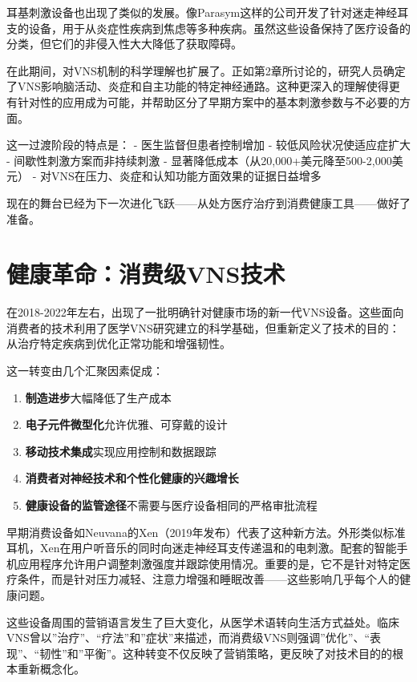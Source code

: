 \documentclass[
  Letterpaper,
]{scrbook}
\providecommand{\tightlist}{%
  \setlength{\itemsep}{0pt}\setlength{\parskip}{0pt}}\usepackage{longtable,booktabs,array}
\begin{document}
耳基刺激设备也出现了类似的发展。像Parasym这样的公司开发了针对迷走神经耳支的设备，用于从炎症性疾病到焦虑等多种疾病。虽然这些设备保持了医疗设备的分类，但它们的非侵入性大大降低了获取障碍。

在此期间，对VNS机制的科学理解也扩展了。正如第2章所讨论的，研究人员确定了VNS影响脑活动、炎症和自主功能的特定神经通路。这种更深入的理解使得更有针对性的应用成为可能，并帮助区分了早期方案中的基本刺激参数与不必要的方面。

这一过渡阶段的特点是： - 医生监督但患者控制增加 -
较低风险状况使适应症扩大 - 间歇性刺激方案而非持续刺激 -
显著降低成本（从20,000+美元降至500-2,000美元） -
对VNS在压力、炎症和认知功能方面效果的证据日益增多

现在的舞台已经为下一次进化飞跃------从处方医疗治疗到消费健康工具------做好了准备。

\section{健康革命：消费级VNS技术}\label{ux5065ux5eb7ux9769ux547dux6d88ux8d39ux7ea7vnsux6280ux672f}

在2018-2022年左右，出现了一批明确针对健康市场的新一代VNS设备。这些面向消费者的技术利用了医学VNS研究建立的科学基础，但重新定义了技术的目的：从治疗特定疾病到优化正常功能和增强韧性。

这一转变由几个汇聚因素促成：

\begin{enumerate}
\def\labelenumi{\arabic{enumi}.}
\tightlist
\item
  \textbf{制造进步}大幅降低了生产成本
\item
  \textbf{电子元件微型化}允许优雅、可穿戴的设计
\item
  \textbf{移动技术集成}实现应用控制和数据跟踪
\item
  \textbf{消费者对神经技术和个性化健康的兴趣增长}
\item
  \textbf{健康设备的监管途径}不需要与医疗设备相同的严格审批流程
\end{enumerate}

早期消费设备如Neuvana的Xen（2019年发布）代表了这种新方法。外形类似标准耳机，Xen在用户听音乐的同时向迷走神经耳支传递温和的电刺激。配套的智能手机应用程序允许用户调整刺激强度并跟踪使用情况。重要的是，它不是针对特定医疗条件，而是针对压力减轻、注意力增强和睡眠改善------这些影响几乎每个人的健康问题。

这些设备周围的营销语言发生了巨大变化，从医学术语转向生活方式益处。临床VNS曾以''治疗''、``疗法''和''症状''来描述，而消费级VNS则强调''优化''、``表现''、``韧性''和''平衡''。这种转变不仅反映了营销策略，更反映了对技术目的的根本重新概念化。
\end{document}
